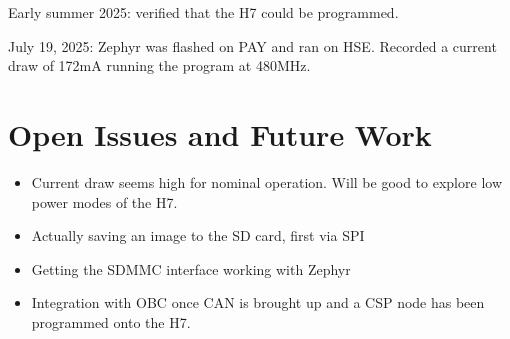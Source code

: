 \documentclass[12pt,a4paper]{article}
\begin{document}
    Early summer 2025: verified that the H7 could be programmed. 

    July 19, 2025: Zephyr was flashed on PAY and ran on HSE. Recorded a current 
    draw of 172mA running the program at 480MHz. 
    

    \section{Open Issues and Future Work}

    \begin{itemize}
        \item Current draw seems high for nominal operation. Will be good to explore low power modes of the H7. 
        \item Actually saving an image to the SD card, first via SPI
        \item Getting the SDMMC interface working with Zephyr
        \item Integration with OBC once CAN is brought up and a CSP node has been programmed onto the H7. 
    \end{itemize}


    \printbibliography
    
            
    \newpage


\end{document}
